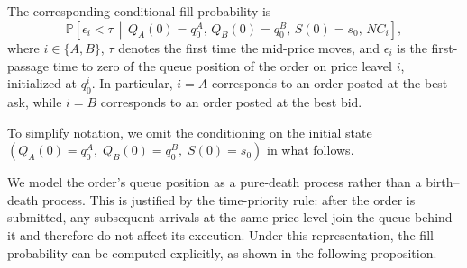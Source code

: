 \documentclass[11pt]{article}
\begin{document}
The corresponding conditional fill probability is
\begin{equation}\label{probexecution}
\mathbb{P}\left[\epsilon_i < \tau \,\middle|\, Q_A(0) = q_0^A,\, Q_B(0) = q_0^B,\, S(0) = s_0,\, NC_i\right],
\end{equation}
where $i\in\{A,B\}$, $\tau$ denotes the first time the mid-price moves, and $\epsilon_i$ is the first-passage time to zero of the queue position of the order on price leavel $i$, initialized at $q_0^i$. In particular, $i=A$ corresponds to an order posted at the best ask, while $i=B$ corresponds to an order posted at the best bid.

To simplify notation, we omit the conditioning on the initial state $(Q_A(0)=q_0^A,\; Q_B(0)=q_0^B,\; S(0)=s_0)$ in what follows.

We model the order's queue position as a pure-death process rather than a birth--death process. This is justified by the time-priority rule: after the order is submitted, any subsequent arrivals at the same price level join the queue behind it and therefore do not affect its execution. Under this representation, the fill probability can be computed explicitly, as shown in the following proposition.
\end{document}
